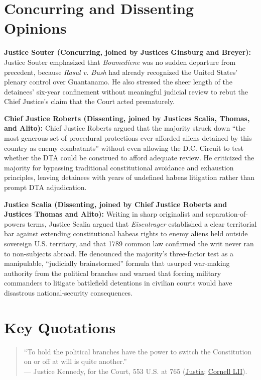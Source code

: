 \documentclass[12pt]{article}
\begin{document}
\section{Concurring and Dissenting Opinions}
\textbf{Justice Souter (Concurring, joined by Justices Ginsburg and Breyer):} Justice Souter emphasized that \textit{Boumediene} was no sudden departure from precedent, because \textit{Rasul v. Bush} had already recognized the United States' plenary control over Guantanamo. He also stressed the sheer length of the detainees' six-year confinement without meaningful judicial review to rebut the Chief Justice's claim that the Court acted prematurely.

\textbf{Chief Justice Roberts (Dissenting, joined by Justices Scalia, Thomas, and Alito):} Chief Justice Roberts argued that the majority struck down ``the most generous set of procedural protections ever afforded aliens detained by this country as enemy combatants'' without even allowing the D.C. Circuit to test whether the DTA could be construed to afford adequate review. He criticized the majority for bypassing traditional constitutional avoidance and exhaustion principles, leaving detainees with years of undefined habeas litigation rather than prompt DTA adjudication.

\textbf{Justice Scalia (Dissenting, joined by Chief Justice Roberts and Justices Thomas and Alito):} Writing in sharp originalist and separation-of-powers terms, Justice Scalia argued that \textit{Eisentrager} established a clear territorial bar against extending constitutional habeas rights to enemy aliens held outside sovereign U.S. territory, and that 1789 common law confirmed the writ never ran to non-subjects abroad. He denounced the majority's three-factor test as a manipulable, ``judicially brainstormed'' formula that usurped war-making authority from the political branches and warned that forcing military commanders to litigate battlefield detentions in civilian courts would have disastrous national-security consequences.

\section{Key Quotations}
\begin{quote}
``To hold the political branches have the power to switch the Constitution on or off at will is quite another.'' \\
--- Justice Kennedy, for the Court, 553 U.S. at 765 (\href{https://supreme.justia.com/cases/federal/us/553/723/}{Justia}; \href{https://www.law.cornell.edu/supct/html/06-1195.ZO.html}{Cornell LII}).
\end{quote}
\end{document}
